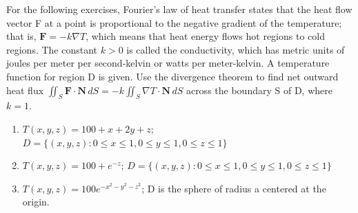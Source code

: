 \documentclass{exercises}
\begin{document}
For the following exercises, Fourier's law of heat transfer states that the heat flow vector F at a point is proportional to the negative gradient of the temperature; that is, $\mathbf{F}=-k\nabla T$, which means that heat energy flows hot regions to cold regions. The constant $k>0$ is called the conductivity, which has metric units of joules per meter per second-kelvin or watts per meter-kelvin. A temperature function for region D is given. Use the divergence theorem to find net outward heat flux $\iint_{S}\mathbf{F}\cdot \mathbf{N}\,dS=-k\iint_{S}\nabla T\cdot \mathbf{N}\,dS$ across the boundary S of D, where $k=1$.

\begin{enumerate}[resume]
\item $T(x,y,z)=100+x+2y+z$; $D=\{(x,y,z):0\le x\le1,0\le y\le1,0\le z\le1\}$
\item $T(x,y,z)=100+e^{-z}$; $D=\{(x,y,z):0\le x\le1,0\le y\le1,0\le z\le1\}$
\item $T(x,y,z)=100e^{-x^{2}-y^{2}-z^{2}}$; D is the sphere of radius a centered at the origin.
\end{enumerate}
\end{document}

